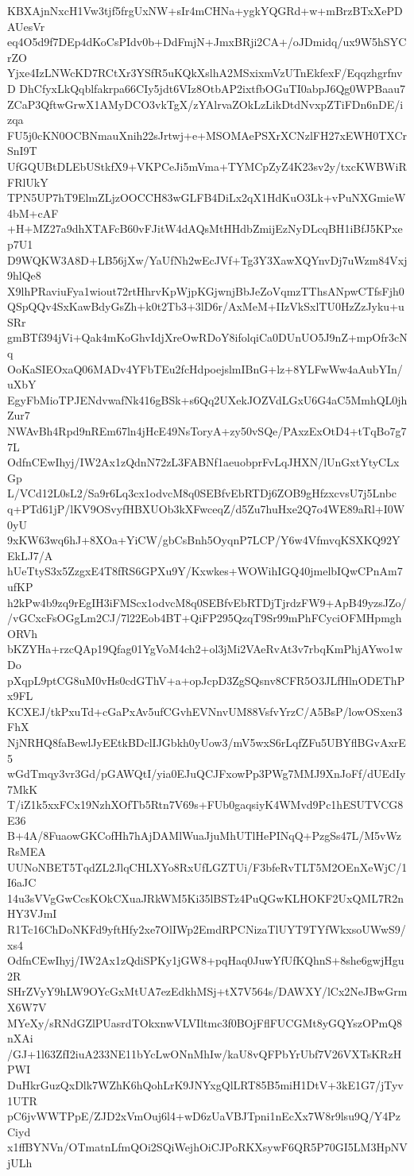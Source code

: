 KBXAjnNxcH1Vw3tjf5frgUxNW+sIr4mCHNa+ygkYQGRd+w+mBrzBTxXePDAUesVr
eq4O5d9f7DEp4dKoCsPIdv0b+DdFmjN+JmxBRji2CA+/oJDmidq/ux9W5hSYCrZO
Yjxe4IzLNWcKD7RCtXr3YSfR5uKQkXslhA2MSxixmVzUTnEkfexF/EqqzhgrfnvD
DhCfyxLkQqblfakrpa66CIy5jdt6VIz8OtbAP2ixtfbOGuTI0abpJ6Qg0WPBaau7
ZCaP3QftwGrwX1AMyDCO3vkTgX/zYAlrvaZOkLzLikDtdNvxpZTiFDn6nDE/izqa
FU5j0cKN0OCBNmauXnih22sJrtwj+e+MSOMAePSXrXCNzlFH27xEWH0TXCrSnI9T
UfGQUBtDLEbUStkfX9+VKPCeJi5mVma+TYMCpZyZ4K23sv2y/txcKWBWiRFRlUkY
TPN5UP7hT9ElmZLjzOOCCH83wGLFB4DiLx2qX1HdKuO3Lk+vPuNXGmieW4bM+cAF
+H+MZ27a9dhXTAFcB60vFJitW4dAQsMtHHdbZmijEzNyDLcqBH1iBfJ5KPxep7U1
D9WQKW3A8D+LB56jXw/YaUfNh2wEcJVf+Tg3Y3XawXQYnvDj7uWzm84Vxj9hlQe8
X9lhPRaviuFya1wiout72rtHhrvKpWjpKGjwnjBbJeZoVqmzTThsANpwCTfsFjh0
QSpQQv4SxKawBdyGsZh+k0t2Tb3+3lD6r/AxMeM+IIzVkSxlTU0HzZzJyku+uSRr
gmBTf394jVi+Qak4mKoGhvIdjXreOwRDoY8ifolqiCa0DUnUO5J9nZ+mpOfr3cNq
OoKaSIEOxaQ06MADv4YFbTEu2fcHdpoejslmIBnG+lz+8YLFwWw4aAubYIn/uXbY
EgyFbMioTPJENdvwafNk416gBSk+s6Qq2UXekJOZVdLGxU6G4aC5MmhQL0jhZur7
NWAvBh4Rpd9nREm67ln4jHcE49NsToryA+zy50vSQe/PAxzExOtD4+tTqBo7g77L
OdfnCEwIhyj/IW2Ax1zQdnN72zL3FABNf1aeuobprFvLqJHXN/lUnGxtYtyCLxGp
L/VCd12L0sL2/Sa9r6Lq3cx1odvcM8q0SEBfvEbRTDj6ZOB9gHfzxcvsU7j5Lnbc
q+PTd61jP/lKV9OSvyfHBXUOb3kXFwceqZ/d5Zu7huHxe2Q7o4WE89aRl+I0W0yU
9xKW63wq6hJ+8XOa+YiCW/gbCsBnh5OyqnP7LCP/Y6w4VfmvqKSXKQ92YEkLJ7/A
hUeTtyS3x5ZzgxE4T8fRS6GPXu9Y/Kxwkes+WOWihIGQ40jmelbIQwCPnAm7ufKP
h2kPw4b9zq9rEgIH3iFMScx1odvcM8q0SEBfvEbRTDjTjrdzFW9+ApB49yzsJZo/
/vGCxcFsOGgLm2CJ/7l22Eob4BT+QiFP295QzqT9Sr99mPhFCyciOFMHpmghORVh
bKZYHa+rzcQAp19Qfag01YgVoM4ch2+ol3jMi2VAeRvAt3v7rbqKmPhjAYwo1wDo
pXqpL9ptCG8uM0vHs0cdGThV+a+opJcpD3ZgSQsnv8CFR5O3JLfHlnODEThPx9FL
KCXEJ/tkPxuTd+cGaPxAv5ufCGvhEVNnvUM88VsfvYrzC/A5BsP/lowOSxen3FhX
NjNRHQ8faBewlJyEEtkBDclIJGbkh0yUow3/mV5wxS6rLqfZFu5UBYflBGvAxrE5
wGdTmqy3vr3Gd/pGAWQtI/yia0EJuQCJFxowPp3PWg7MMJ9XnJoFf/dUEdIy7MkK
T/iZ1k5xxFCx19NzhXOfTb5Rtn7V69s+FUb0gaqsiyK4WMvd9Pc1hESUTVCG8E36
B+4A/8FuaowGKCofHh7hAjDAMlWuaJjuMhUTlHePINqQ+PzgSs47L/M5vWzRsMEA
UUNoNBET5TqdZL2JlqCHLXYo8RxUfLGZTUi/F3bfeRvTLT5M2OEnXeWjC/1I6aJC
14u3sVVgGwCcsKOkCXuaJRkWM5Ki35lBSTz4PuQGwKLHOKF2UxQML7R2nHY3VJmI
R1Tc16ChDoNKFd9yftHfy2xe7OlIWp2EmdRPCNizaTlUYT9TYfWkxsoUWwS9/xs4
OdfnCEwIhyj/IW2Ax1zQdiSPKy1jGW8+pqHaq0JuwYfUfKQhnS+8she6gwjHgu2R
SHrZVyY9hLW9OYcGxMtUA7ezEdkhMSj+tX7V564s/DAWXY/lCx2NeJBwGrmX6W7V
MYeXy/sRNdGZlPUasrdTOkxnwVLVIltmc3f0BOjFflFUCGMt8yGQYszOPmQ8nXAi
/GJ+1l63ZfI2iuA233NE11bYcLwONnMhIw/kaU8vQFPbYrUbf7V26VXTsKRzHPWI
DuHkrGuzQxDlk7WZhK6hQohLrK9JNYxgQlLRT85B5miH1DtV+3kE1G7/jTyv1UTR
pC6jvWWTPpE/ZJD2xVmOuj6l4+wD6zUaVBJTpni1nEcXx7W8r9lsu9Q/Y4PzCiyd
x1ffBYNVn/OTmatnLfmQOi2SQiWejhOiCJPoRKXsywF6QR5P70GI5LM3HpNVjULh
